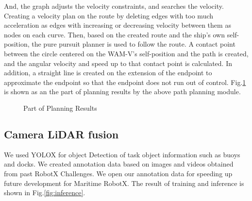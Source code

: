 \documentclass[lettersize,journal]{IEEEtran}
\begin{document}
And, the graph adjusts the velocity constraints, and searches the velocity.
Creating a velocity plan on the route by deleting edges with too much acceleration as edges with increasing or decreasing velocity between them as nodes on each curve.
Then, based on the created route and the ship's own self-position, the pure pursuit planner is used to follow the route.
A contact point between the circle centered on the WAM-V's self-position and the path is created, and the angular velocity and speed up to that contact point is calculated.
In addition, a straight line is created on the extension of the endpoint to approximate the endpoint so that the endpoint does not run out of control.
Fig.\ref{fig:the part of planning results} is shown as an the part of planning results by the above path planning module.
\begin{figure}[H]
  \begin{center}
  \end{center}
  \caption{Part of Planning Results}
  \label{fig:the part of planning results}
\end{figure}

\subsection{Camera LiDAR fusion}
We used  YOLOX\cite{YOLOX} for object Detection of task object information such as buoys and docks.
We created annotation data based on images and videos obtained from past RobotX Challenges.
We open our annotation data for speeding up future development for Maritime RobotX. \cite{dataset_annotations}
The result of training and inference is shown in Fig.\ref{fig:inference}.
\end{document}
